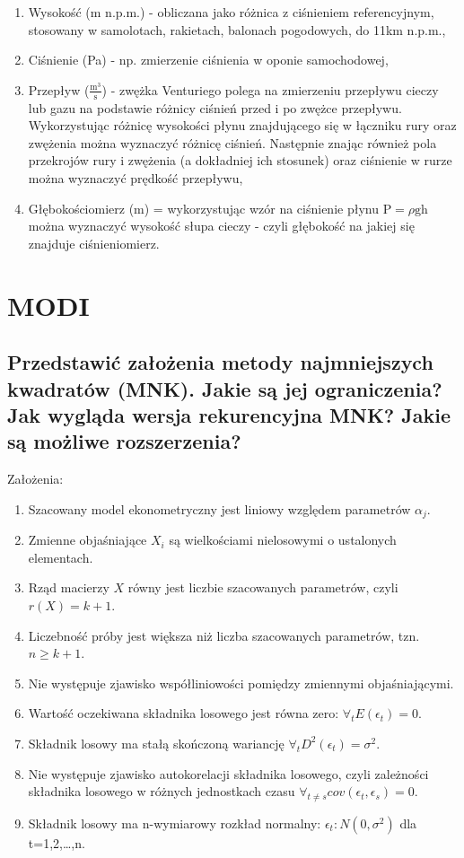 \begin{enumerate}
    \item Wysokość (m n.p.m.) - obliczana jako różnica z ciśnieniem referencyjnym, stosowany w samolotach, rakietach, balonach pogodowych, do 11km n.p.m.,
    \item Ciśnienie (Pa) - np. zmierzenie ciśnienia w oponie samochodowej,
    \item Przepływ ($\frac{\mathrm{m}^3}{\mathrm{s}}$) - zwężka Venturiego polega na zmierzeniu przepływu cieczy lub gazu na podstawie różnicy ciśnień przed i po zwężce przepływu. Wykorzystując różnicę wysokości płynu znajdującego się w łączniku rury oraz zwężenia można wyznaczyć różnicę ciśnień. Następnie znając również pola przekrojów rury i zwężenia (a dokładniej ich stosunek) oraz ciśnienie w rurze można wyznaczyć prędkość przepływu,
    \item Głębokościomierz (m) = wykorzystując wzór na ciśnienie płynu $\mathrm{P} = \rho\mathrm{g}\mathrm{h}$ można wyznaczyć wysokość słupa cieczy - czyli głębokość na jakiej się znajduje ciśnieniomierz.
\end{enumerate}

\section{MODI}
\subsection{Przedstawić założenia metody najmniejszych kwadratów (MNK). Jakie są jej ograniczenia? Jak wygląda wersja rekurencyjna MNK? Jakie są możliwe rozszerzenia?}
Założenia:
\begin{enumerate}
    \item Szacowany model ekonometryczny jest liniowy względem parametrów $\alpha_j$. 
    \item Zmienne objaśniające $X_i$ są wielkościami nielosowymi o ustalonych elementach.
    \item Rząd macierzy $X$ równy jest liczbie szacowanych parametrów, czyli $r(X) = k + 1$.
    \item Liczebność próby jest większa niż liczba szacowanych parametrów, tzn. $n \geq k+1$.
    \item Nie występuje zjawisko współliniowości pomiędzy zmiennymi objaśniającymi.
    \item Wartość oczekiwana składnika losowego jest równa zero: $\forall_t E(\epsilon _t) = 0$.
    \item Składnik losowy ma stałą skończoną wariancję  $\forall_t D^2(\epsilon _t) = \sigma^2$.
    \item Nie występuje zjawisko autokorelacji składnika losowego, czyli zależności składnika losowego w różnych jednostkach czasu  $\forall_{t\neq s} cov(\epsilon _t, \epsilon_s) = 0$.
    \item Składnik losowy ma n-wymiarowy rozkład normalny: $\epsilon _t : N(0,\sigma^2)$ dla t=1,2,…,n.
\end{enumerate}

